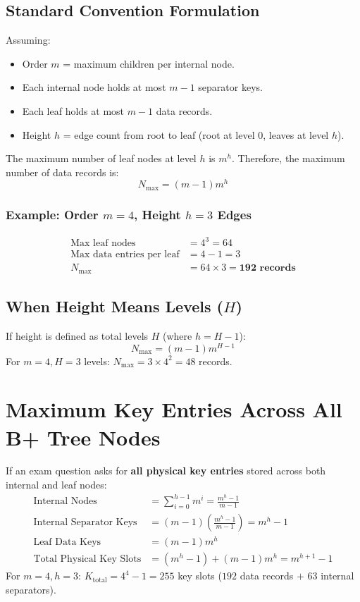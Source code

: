 \subsection{Standard Convention Formulation}
Assuming:
\begin{itemize}
    \item Order $m$ = maximum children per internal node.
    \item Each internal node holds at most $m - 1$ separator keys.
    \item Each leaf holds at most $m - 1$ data records.
    \item Height $h$ = edge count from root to leaf (root at level $0$, leaves at level $h$).
\end{itemize}

The maximum number of leaf nodes at level $h$ is $m^h$. Therefore, the maximum number of data records is:
\[
\boxed{N_{\max} = (m - 1) m^h}
\]

\subsubsection{Example: Order $m=4$, Height $h=3$ Edges}
\begin{align*}
\text{Max leaf nodes} &= 4^3 = 64 \\
\text{Max data entries per leaf} &= 4 - 1 = 3 \\
\boxed{N_{\max}} &= 64 \times 3 = \mathbf{192 \text{ records}}
\end{align*}

\subsection{When Height Means Levels ($H$)}
If height is defined as total levels $H$ (where $h = H - 1$):
\[
\boxed{N_{\max} = (m - 1) m^{H - 1}}
\]
For $m=4, H=3$ levels: $N_{\max} = 3 \times 4^2 = 48$ records.

\section{Maximum Key Entries Across All B+ Tree Nodes}

If an exam question asks for \textbf{all physical key entries} stored across both internal and leaf nodes:
\begin{align*}
\text{Internal Nodes} &= \sum_{i=0}^{h-1} m^i = \frac{m^h - 1}{m - 1} \\
\text{Internal Separator Keys} &= (m - 1) \left( \frac{m^h - 1}{m - 1} \right) = m^h - 1 \\
\text{Leaf Data Keys} &= (m - 1) m^h \\
\text{Total Physical Key Slots} &= (m^h - 1) + (m - 1) m^h = \boxed{m^{h+1} - 1}
\end{align*}
For $m=4, h=3$: $K_{\text{total}} = 4^4 - 1 = 255$ key slots ($192$ data records $+$ $63$ internal separators).

